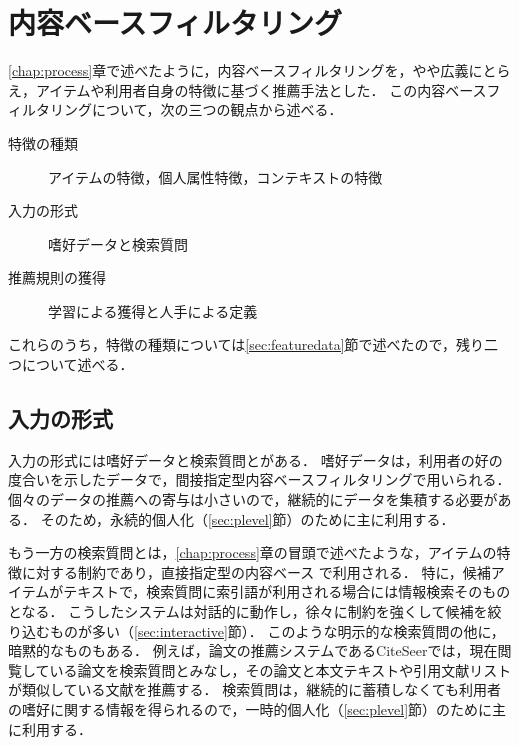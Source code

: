 \chapter{内容ベースフィルタリング}
\label{chap:cbf}

\ref{chap:process}章で述べたように，内容ベースフィルタリングを，やや広義にとらえ，アイテムや利用者自身の特徴に基づく推薦手法とした．
この内容ベースフィルタリングについて，次の三つの観点から述べる．
\begin{description}
 \item[特徴の種類] アイテムの特徴，個人属性特徴，コンテキストの特徴
 \item[入力の形式] 嗜好データと検索質問
 \item[推薦規則の獲得] 学習による獲得と人手による定義
\end{description}
これらのうち，特徴の種類については\ref{sec:featuredata}節で述べたので，残り二つについて述べる．


\section{入力の形式}
\label{sec:cbfinput}

入力の形式には嗜好データと検索質問とがある．
嗜好データは，利用者の好の度合いを示したデータで，間接指定型内容ベースフィルタリング\cite{misc:091,tjsai:05:05,trjsai:06:01}で用いられる．
個々のデータの推薦への寄与は小さいので，継続的にデータを集積する必要がある．
そのため，永続的個人化（\ref{sec:plevel}節）のために主に利用する．

もう一方の検索質問とは，\ref{chap:process}章の冒頭で述べたような，アイテムの特徴に対する制約であり，直接指定型の内容ベース
\cite{ec:024,ijcai:03:04,jair:04:01,ieeem:07:06}で利用される．
特に，候補アイテムがテキストで，検索質問に索引語が利用される場合には情報検索\cite{j:0021}そのものとなる．
こうしたシステムは対話的に動作し，徐々に制約を強くして候補を絞り込むものが多い（\ref{sec:interactive}節）．
このような明示的な検索質問の他に，暗黙的なものもある．
例えば，論文の推薦システムであるCiteSeer\cite{ieeem:99:02}では，現在閲覧している論文を検索質問とみなし，その論文と本文テキストや引用文献リストが類似している文献を推薦する．
検索質問は，継続的に蓄積しなくても利用者の嗜好に関する情報を得られるので，一時的個人化（\ref{sec:plevel}節）のために主に利用する．


